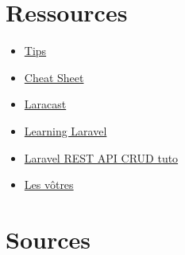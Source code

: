 \hypertarget{ressources}{%
\section{Ressources}\label{ressources}}

\begin{itemize}
\tightlist
\item
  \href{https://github.com/LaravelDaily/laravel-tips}{Tips}
\item
  \href{https://hackr.io/blog/laravel-cheat-sheet}{Cheat Sheet}
\item
  \href{https://laracasts.com/search?query=laravel\%209}{Laracast}
\item
  \href{http://learninglaravel.net/tags/tutorials}{Learning Laravel}
\item
  \href{https://www.tutsmake.com/laravel-8-rest-api-crud-with-passport-auth-tutorial/}{Laravel
  REST API CRUD tuto}
\item
  \href{https://github.com/HE-Arc/slides-devweb/wiki/Ressources}{Les
  vôtres}
\end{itemize}

\hypertarget{sources}{%
\section{Sources}\label{sources}}
